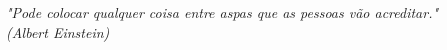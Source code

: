 \begin{epigrafe}
  \vspace*{\fill}
  \begin{flushright}
    \textit{"Pode colocar qualquer coisa entre aspas que as pessoas vão acreditar." \\
    (Albert Einstein)}
  \end{flushright}
\end{epigrafe}
